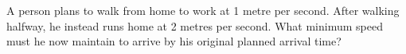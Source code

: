 A person plans to walk from home to work at 1 metre per second. After walking halfway, he instead runs home at 2 metres per second. What minimum speed must he now maintain to arrive by his original planned arrival time?
